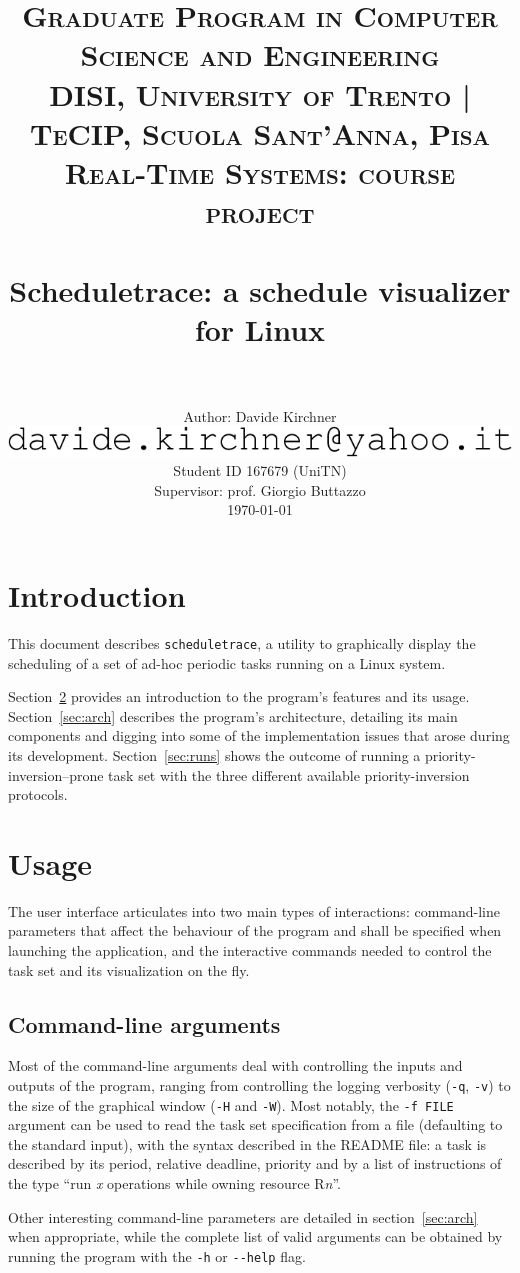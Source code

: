\documentclass[paper=a4, fontsize=11pt]{scrartcl}
\title{
        \vspace{-1in}
        \usefont{OT1}{bch}{b}{n}
        \normalfont \normalsize \textsc{Graduate Program in Computer Science and Engineering} \\
        \normalfont \normalsize \textsc{DISI, University of Trento | TeCIP, Scuola Sant'Anna, Pisa} \\ [6pt]
        \normalfont \normalsize \textsc{Real-Time Systems: course project} \\ [25pt]
        \horrule{0.5pt} \\[0.4cm]
        \huge Scheduletrace: a schedule visualizer for Linux \\
        \horrule{2pt} \\[0.5cm]
}
\author{
        \normalfont                                 \normalsize
        Author: Davide Kirchner \\[-3pt]  \normalsize
        \includegraphics[height=1.8ex]{img/addr.png}\vspace{-.4ex}\\[-3pt]     \normalsize
        Student ID 167679 (UniTN) \\[-3pt]     \normalsize
        Supervisor: prof. Giorgio Buttazzo \\[-3pt]      \normalsize
        \today
}
\date{}
\newcommand{\mono}[1]{\texttt{#1}}
\numberwithin{equation}{section}        %
\numberwithin{figure}{section}          %
\numberwithin{table}{section}               %
\numberwithin{fragment}{section}
\begin{document}
\maketitle

\setcounter{tocdepth}{3}
\tableofcontents
\clearpage

\section{Introduction}\label{sec:intro}
This document describes \mono{scheduletrace}, a utility to graphically display the scheduling of a set of ad-hoc periodic tasks running on a Linux system.

Section~\ref{sec:usage} provides an introduction to the program's features and its usage. Section~\ref{sec:arch} describes the program's architecture, detailing its main components and digging into some of the implementation issues that arose during its development. Section~\ref{sec:runs} shows the outcome of running a priority-inversion--prone task set with the three different available priority-inversion protocols.


\section{Usage}\label{sec:usage}
The user interface articulates into two main types of interactions: command-line parameters that affect the behaviour of the program and shall be specified when launching the application, and the interactive commands needed to control the task set and its visualization on the fly.

\subsection{Command-line arguments}
Most of the command-line arguments deal with controlling the inputs and outputs of the program, ranging from controlling the logging verbosity (\mono{-q}, \mono{-v}) to the size of the graphical window (\mono{-H} and \mono{-W}). Most notably, the \mono{-f FILE} argument can be used to read the task set specification from a file (defaulting to the standard input), with the syntax described in the README file: a task is described by its period, relative deadline, priority and by a list of instructions of the type ``run \textit{x} operations while owning resource R\textit{n}''.

Other interesting command-line parameters are detailed in section~\ref{sec:arch} when appropriate, while the complete list of valid arguments can be obtained by running the program with the \mono{-h} or \mono{-{}-help} flag.
\end{document}
